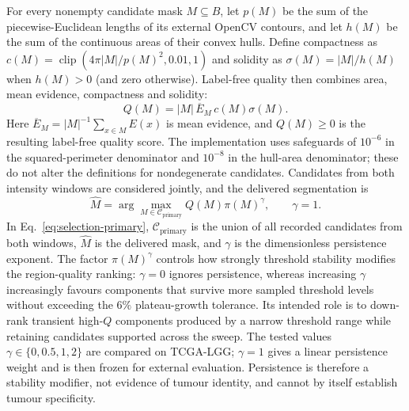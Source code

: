 \documentclass[11pt,a4paper]{article}
\begin{document}
For every nonempty candidate mask $M\subseteq B$, let $p(M)$ be the sum of the
piecewise-Euclidean lengths of its external OpenCV contours, and let $h(M)$ be
the sum of the continuous areas of their convex hulls. Define compactness as
$c(M)=\operatorname{clip}(4\pi|M|/p(M)^2,0.01,1)$ and solidity as
$\sigma(M)=|M|/h(M)$ when $h(M)>0$ (and zero otherwise). Label-free quality
then combines area, mean evidence, compactness and solidity:
\begin{equation}
 Q(M)=|M|\,\overline E_M\,c(M)\sigma(M).
\label{eq:quality-primary}
\end{equation}
Here $\overline E_M=|M|^{-1}\sum_{x\in M}E(x)$ is mean evidence,
and $Q(M)\ge0$ is the resulting label-free quality score. The implementation
uses safeguards of $10^{-6}$ in the squared-perimeter denominator and $10^{-8}$
in the hull-area denominator; these do not alter the definitions for nondegenerate
candidates.
Candidates from both intensity windows are considered jointly, and the delivered
segmentation is
\begin{equation}
 \widehat M=\arg\max_{M\in\mathcal C_{\mathrm{primary}}}
 Q(M)\pi(M)^\gamma,\qquad \gamma=1.
\label{eq:selection-primary}
\end{equation}
In Eq.~\eqref{eq:selection-primary}, $\mathcal C_{\mathrm{primary}}$ is the union
of all recorded candidates from both windows, $\widehat M$ is the delivered mask,
and $\gamma$ is the dimensionless persistence exponent.
The factor $\pi(M)^\gamma$ controls how strongly threshold stability modifies
the region-quality ranking: $\gamma=0$ ignores persistence, whereas increasing
$\gamma$ increasingly favours components that survive more sampled threshold
levels without exceeding the $6\%$ plateau-growth tolerance. Its intended role
is to down-rank transient high-$Q$ components produced by a narrow threshold
range while retaining candidates supported across the sweep. The tested values
$\gamma\in\{0,0.5,1,2\}$ are compared on TCGA-LGG; $\gamma=1$ gives a linear
persistence weight and is then frozen for external evaluation. Persistence is
therefore a stability modifier, not evidence of tumour identity, and cannot by
itself establish tumour specificity.
\end{document}
